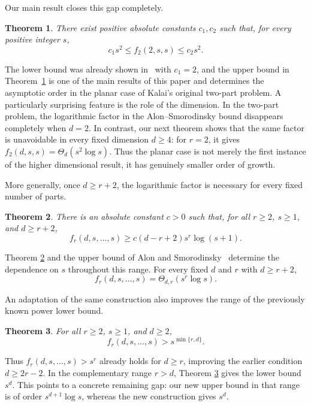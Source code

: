 \documentclass[11pt]{article}
\newtheorem{theorem}{Theorem}[section]
\theoremstyle{definition}
\begin{document}
Our main result closes this gap completely.

\begin{theorem}\label{thm:planar}
There exist positive absolute constants \(c_{1},c_{2}\) such that, for every positive integer \(s\),
\[
c_{1}s^{2}\le f_{2}(2,s,s)\le c_{2}s^{2}.
\]
\end{theorem}
The lower bound was already shown in~\cite{ChenGeShuWangXu2025} with \(c_{1}=2\), and the upper bound in
Theorem~\ref{thm:planar} is one of the main results of this paper and determines the asymptotic order in the planar case of Kalai's original two-part problem. A particularly surprising feature is the role of the dimension. In the two-part problem, the logarithmic factor in the Alon--Smorodinsky bound disappears completely when \(d=2\). In contrast, our next theorem shows that the same factor is unavoidable in every fixed dimension \(d\ge4\): for \(r=2\), it gives \(f_{2}(d,s,s)=\Theta_{d}(s^{2}\log s)\). Thus the planar case is not merely the first instance of the higher dimensional result, it has genuinely smaller order of growth.

More generally, once \(d\ge r+2\), the logarithmic factor is necessary for every fixed number of parts.

\begin{theorem}\label{thm:lower}
There is an absolute constant \(c>0\) such that, for all \(r\ge2\), \(s\ge1\), and \(d\ge r+2\),
\[
f_{r}(d,s,\ldots,s)\ge c(d-r+2)s^{r}\log(s+1).
\]
\end{theorem}

Theorem \ref{thm:lower} and the upper bound of Alon and Smorodinsky~\cite{AlonSmorodinsky2025} determine the dependence on \(s\) throughout this range. For every fixed \(d\) and \(r\) with \(d\ge r+2\),
\[
f_{r}(d,s,\ldots,s)=\Theta_{d,r}(s^{r}\log{s}).
\]

An adaptation of the same construction also improves the range of the previously known power lower bound.

\begin{theorem}\label{thm:power-lower}
For all \(r\ge2\), \(s\ge1\), and \(d\ge2\),
\[
f_{r}(d,s,\ldots,s)>s^{\min\{r,d\}}.
\]
\end{theorem}

Thus \(f_{r}(d,s,\ldots,s)>s^{r}\) already holds for \(d\ge r\), improving the earlier condition \(d\ge2r-2\). In the complementary range \(r> d\), Theorem \ref{thm:power-lower} gives the lower bound \(s^{d}\). This points to a concrete remaining gap: our new upper bound in that range is of order \(s^{d+1}\log{s}\), whereas the new construction gives \(s^{d}\).
\end{document}
